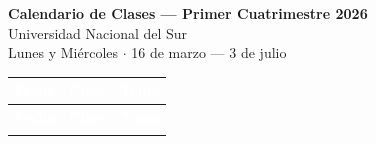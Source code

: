 \documentclass[a4paper,11pt]{article}
\begin{document}
\begin{center}
    {\Large \textbf{Calendario de Clases --- Primer Cuatrimestre 2026}}\\[0.4em]
    {\large Universidad Nacional del Sur}\\[0.2em]
    {\normalsize Lunes y Miércoles $\cdot$ 16 de marzo --- 3 de julio}
\end{center}

\vspace{1em}

\begin{longtable}{|>{\bfseries}p{3cm}|>{\centering\arraybackslash}p{1.2cm}|p{9cm}|}
\hline
\rowcolor{encabezado}
\textcolor{white}{\textbf{Fecha}} & \textcolor{white}{\textbf{Clase}} & \textcolor{white}{\textbf{Tema}} \\
\hline
\endfirsthead
\hline
\rowcolor{encabezado}
\textcolor{white}{\textbf{Fecha}} & \textcolor{white}{\textbf{Clase}} & \textcolor{white}{\textbf{Tema}} \\
\hline
\endhead
\hline
\endfoot


\end{longtable}
\end{document}
